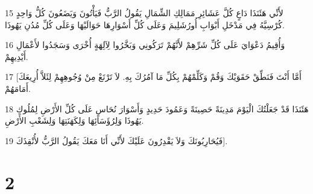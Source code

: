 \par 15 لأَنِّي هَئَنَذَا دَاعٍ كُلَّ عَشَائِرِ مَمَالِكِ الشِّمَالِ يَقُولُ الرَّبُّ فَيَأْتُونَ وَيَضَعُونَ كُلُّ وَاحِدٍ كُرْسِيَّهُ فِي مَدْخَلِ أَبْوَابِ أُورُشَلِيمَ وَعَلَى كُلِّ أَسْوَارِهَا حَوَالَيْهَا وَعَلَى كُلِّ مُدُنِ يَهُوذَا.
\par 16 وَأُقِيمُ دَعْوَايَ عَلَى كُلِّ شَرِّهِمْ لأَنَّهُمْ تَرَكُونِي وَبَخَّرُوا لِآلِهَةٍ أُخْرَى وَسَجَدُوا لأَعْمَالِ أَيْدِيهِمْ.
\par 17 [أَمَّا أَنْتَ فَنَطِّقْ حَقَوَيْكَ وَقُمْ وَكَلِّمْهُمْ بِكُلِّ مَا آمُرُكَ بِهِ. لاَ تَرْتَعْ مِنْ وُجُوهِهِمْ لِئَلاَّ أُرِيعَكَ أَمَامَهُمْ.
\par 18 هَئَنَذَا قَدْ جَعَلْتُكَ الْيَوْمَ مَدِينَةً حَصِينَةً وَعَمُودَ حَدِيدٍ وَأَسْوَارَ نُحَاسٍ عَلَى كُلِّ الأَرْضِ لِمُلُوكِ يَهُوذَا وَلِرُؤَسَائِهَا وَلِكَهَنَتِهَا وَلِشَعْبِ الأَرْضِ.
\par 19 فَيُحَارِبُونَكَ وَلاَ يَقْدِرُونَ عَلَيْكَ لأَنِّي أَنَا مَعَكَ يَقُولُ الرَّبُّ لأُنْقِذَكَ].

\chapter{2}

